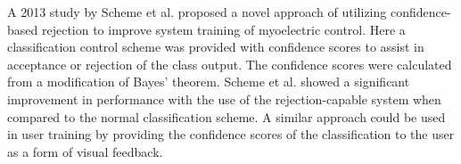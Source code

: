 A 2013 study by Scheme et al. \cite{Scheme2013} proposed a novel approach of utilizing confidence-based rejection to improve system training of myoelectric control. Here a classification control scheme was provided with confidence scores to assist in acceptance or rejection of the class output. The confidence scores were calculated from a modification of Bayes' theorem. Scheme et al. \cite{Scheme2013} showed a significant improvement in performance with the use of the rejection-capable system when compared to the normal classification scheme. A similar approach could be used in user training by providing the confidence scores of the classification to the user as a form of visual feedback. 

